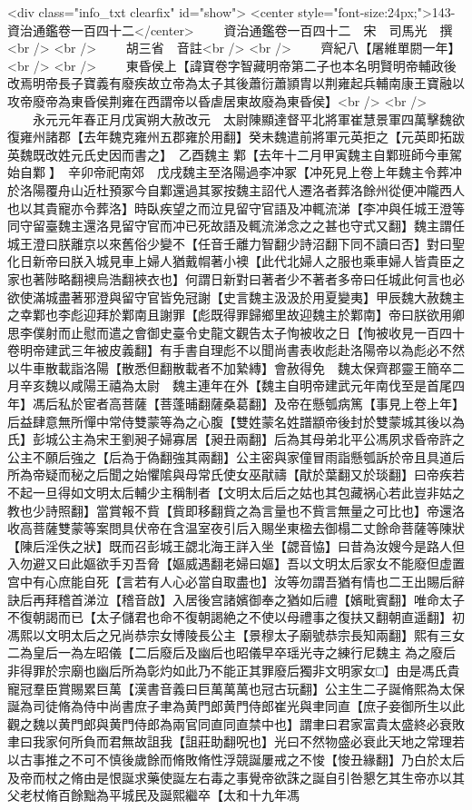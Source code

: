 <div class="info_txt clearfix" id="show">
<center style="font-size:24px;">143-資治通鑑卷一百四十二</center>
  　　資治通鑑卷一百四十二　宋　司馬光　撰<br />
<br />
　　胡三省　音註<br />
<br />
　　齊紀八【屠維單閼一年】<br />
<br />
　　東昏侯上【諱寶卷字智藏明帝第二子也本名明賢明帝輔政後改焉明帝長子寶義有廢疾故立帝為太子其後蕭衍蕭頴胄以荆雍起兵輔南康王寶融以攻帝廢帝為東昏侯荆雍在西謂帝以昏虐居東故廢為東昏侯】<br />
<br />
　　永元元年春正月戊寅朔大赦改元　太尉陳顯達督平北將軍崔慧景軍四萬擊魏欲復雍州諸郡【去年魏克雍州五郡雍於用翻】癸未魏遣前將軍元英拒之【元英即拓跋英魏既改姓元氏史因而書之】　乙酉魏主鄴【去年十二月甲寅魏主自鄴班師今車駕始自鄴】　辛卯帝祀南郊　戊戌魏主至洛陽過李冲冢【冲死見上卷上年魏主令葬冲於洛陽覆舟山近杜預冢今自鄴還過其冢按魏主詔代人遷洛者葬洛餘州從便冲隴西人也以其貴寵亦令葬洛】時臥疾望之而泣見留守官語及冲輒流涕【李冲與任城王澄等同守留臺魏主還洛見留守官而冲已死故語及輒流涕念之之甚也守式又翻】魏主謂任城王澄曰朕離京以來舊俗少變不【任音壬離力智翻少詩沼翻下同不讀曰否】對曰聖化日新帝曰朕入城見車上婦人猶戴㡌著小襖【此代北婦人之服也乘車婦人皆貴臣之家也著陟略翻襖烏浩翻裌衣也】何謂日新對曰著者少不著者多帝曰任城此何言也必欲使滿城盡著邪澄與留守官皆免冠謝【史言魏主汲汲於用夏變夷】甲辰魏大赦魏主之幸鄴也李彪迎拜於鄴南且謝罪【彪既得罪歸鄉里故迎魏主於鄴南】帝曰朕欲用卿思李僕射而止慰而遣之會御史臺令史龍文觀告太子恂被收之日【恂被收見一百四十卷明帝建武三年被皮義翻】有手書自理彪不以聞尚書表收彪赴洛陽帝以為彪必不然以牛車散載詣洛陽【散悉但翻散載者不加縶縳】會赦得免　魏太保齊郡靈王簡卒二月辛亥魏以咸陽王禧為太尉　魏主連年在外【魏主自明帝建武元年南伐至是首尾四年】馮后私於宦者高菩薩【菩蓬晡翻薩桑葛翻】及帝在懸瓠病篤【事見上卷上年】后益肆意無所憚中常侍雙蒙等為之心腹【雙姓蒙名姓譜顓帝後封於雙蒙城其後以為氏】彭城公主為宋王劉昶子婦寡居【昶丑兩翻】后為其母弟北平公馮夙求昏帝許之公主不願后強之【后為于偽翻強其兩翻】公主密與家僮冒雨詣懸瓠訴於帝且具道后所為帝疑而秘之后聞之始懼隂與母常氏使女巫猒禱【猒於葉翻又於琰翻】曰帝疾若不起一旦得如文明太后輔少主稱制者【文明太后后之姑也其包藏祸心若此豈非姑之教也少詩照翻】當賞報不貲【貲即移翻貲之為言量也不貲言無量之可比也】帝還洛收高菩薩雙蒙等案問具伏帝在含温室夜引后入賜坐東楹去御榻二丈餘命菩薩等陳狀【陳后淫佚之狀】既而召彭城王勰北海王詳入坐【勰音恊】曰昔為汝嫂今是路人但入勿避又曰此嫗欲手刃吾脅【嫗威遇翻老婦曰嫗】吾以文明太后家女不能廢但虚置宫中有心庶能自死【言若有人心必當自取盡也】汝等勿謂吾猶有情也二王出賜后辭訣后再拜稽首涕泣【稽音啟】入居後宫諸嬪御奉之猶如后禮【嬪毗賓翻】唯命太子不復朝謁而已【太子儲君也命不復朝謁絶之不使以母禮事之復扶又翻朝直遥翻】初馮熙以文明太后之兄尚恭宗女博陵長公主【景穆太子廟號恭宗長知兩翻】熙有三女二為皇后一為左昭儀【二后廢后及幽后也昭儀早卒瑶光寺之練行尼魏主為之廢后非得罪於宗廟也幽后所為彰灼如此乃不能正其罪廢后獨非文明家女□】由是馮氏貴寵冠羣臣賞賜累巨萬【漢書音義曰巨萬萬萬也冠古玩翻】公主生二子誕脩熙為太保誕為司徒脩為侍中尚書庶子聿為黄門郎黄門侍郎崔光與聿同直【庶子妾御所生以此觀之魏以黄門郎與黄門侍郎為兩官同直同直禁中也】謂聿曰君家富貴太盛終必衰敗聿曰我家何所負而君無故詛我【詛莊助翻呪也】光曰不然物盛必衰此天地之常理若以古事推之不可不慎後歲餘而脩敗脩性浮競誕屢戒之不悛【悛丑緣翻】乃白於太后及帝而杖之脩由是恨誕求藥使誕左右毒之事覺帝欲誅之誕自引咎懇乞其生帝亦以其父老杖脩百餘黜為平城民及誕熙繼卒【太和十九年馮